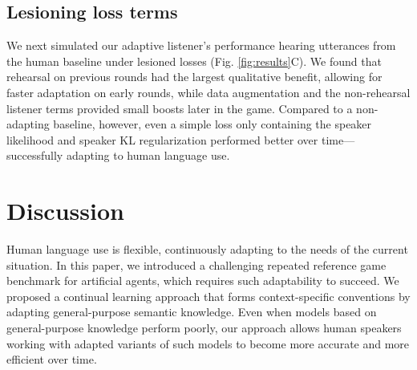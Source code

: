 \subsection{Lesioning loss terms}

We next simulated our adaptive listener's performance hearing utterances from the human baseline under lesioned losses (Fig. \ref{fig:results}C). 
We found that rehearsal on previous rounds had the largest qualitative benefit, allowing for faster adaptation on early rounds, while data augmentation and the non-rehearsal listener terms provided small boosts later in the game.
Compared to a non-adapting baseline, however, even a simple loss only containing the speaker likelihood and speaker KL regularization performed better over time---successfully adapting to human language use.

\section{Discussion}

Human language use is flexible, continuously adapting to the needs of the current situation. 
In this paper, we introduced a challenging repeated reference game benchmark for artificial agents, which requires such adaptability to succeed. 
We proposed a continual learning approach that forms context-specific conventions by adapting general-purpose semantic knowledge.
Even when models based on general-purpose knowledge perform poorly, our approach allows human speakers working with adapted variants of such models to become more accurate and more efficient over time.

